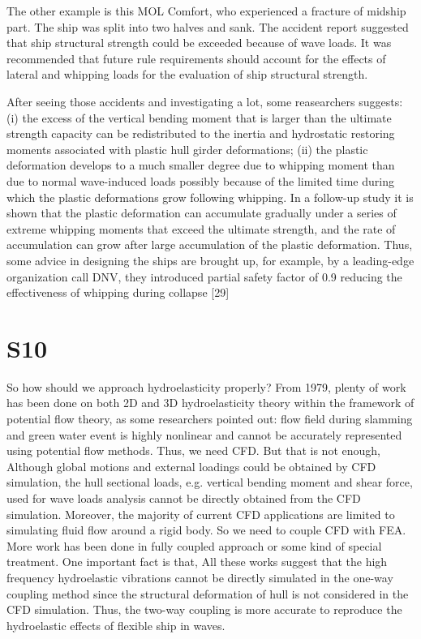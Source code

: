 \documentclass[17pt]{extarticle} %
\begin{document}
The other example is this MOL Comfort, who experienced a fracture of midship part. The ship was split into two halves and sank. The accident report suggested that 
ship structural strength could be exceeded because of wave loads. It was recommended that future rule requirements should account for the effects of lateral and whipping loads for 
the evaluation of ship structural strength.

After seeing those accidents and investigating a lot, some reasearchers suggests: (i) the excess of the vertical bending moment that is larger than the ultimate 
strength capacity can be redistributed to the inertia and hydrostatic restoring moments associated with plastic hull girder deformations; (ii) the 
plastic deformation develops to a much smaller degree due to whipping moment than due to normal wave-induced loads possibly because of the limited 
time during which the plastic deformations grow following whipping. In a follow-up study it is shown that the plastic deformation can accumulate 
gradually under a series of extreme whipping moments that exceed the ultimate strength, and the rate of accumulation can grow after large accumulation 
of the plastic deformation. Thus, some advice in designing the ships are brought up, for example, by a leading-edge organization call DNV, they introduced partial safety factor of 0.9 reducing the effectiveness of whipping during collapse [29]

\section*{S10}
So how should we approach hydroelasticity properly?
From 1979, plenty of work has been done on both 2D and 3D hydroelasticity theory within the framework of potential flow theory, as some researchers pointed out: 
flow field during slamming and green water event is highly nonlinear and cannot be accurately represented using potential flow methods.
Thus, we need CFD. But that is not enough, Although global motions and external loadings could be obtained by CFD simulation, the hull sectional loads, e.g. 
vertical bending moment and shear force, used for wave loads analysis cannot be directly obtained from the CFD simulation. Moreover, the majority of current 
CFD applications are limited to simulating fluid flow around a rigid body. So we need to couple CFD with FEA. More work has been done in fully coupled approach or some kind of special treatment.
One important fact is that, 
All these works suggest that the high frequency hydroelastic vibrations cannot be directly simulated in the one-way coupling method since the structural 
deformation of hull is not considered in the CFD simulation. Thus, the two-way coupling is more accurate to reproduce the hydroelastic effects of flexible ship in waves.
\end{document}
